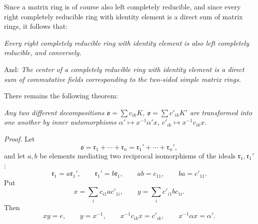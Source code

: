 \documentclass[11pt]{article}
\providecommand{\mo}{\mathfrak{o}}
\providecommand{\mr}{\mathfrak{r}}
\begin{document}
Since a matrix ring is of course also left completely reducible, and since every right completely reducible ring with identity element is a direct sum of matrix rings, it follows that:

\emph{Every right completely reducible ring with identity element is also left completely reducible, and conversely.}

And: \emph{The center of a completely reducible ring with identity element is a direct sum of commutative fields corresponding to the two-sided simple matrix rings.}

There remains the following theorem:

\emph{Any two different decompositions $\mo=\sum c_{ik}K$, $\mo=\sum c'_{ik}K'$ are transformed into one another by inner automorphisms $\alpha'\mapsto x^{-1}\alpha'x$, $c'_{ik}\mapsto x^{-1}c_{ik}x$.}

\emph{Proof.} Let
\[
        \mo=\mr_1+\cdots+\mr_n=\mr_1'+\cdots+\mr_n',
\]
and let $a,b$ be elements mediating two reciprocal isomorphisms of the ideals $\mr_1,\mr_1'$:
\[
        \mr_1=a\mr_1',
        \qquad
        \mr_1'=b\mr_1,
        \qquad
        ab=c_{11},
        \qquad
        ba=c'_{11}.
\]
Put
\[
        x=\sum_i c_{i1}ac'_{1i},
        \qquad
        y=\sum_i c'_{i1}bc_{1i}.
\]
Then
\[
        xy=e,
        \qquad
        y=x^{-1},
        \qquad
        x^{-1}c_{ik}x=c'_{ik},
        \qquad
        x^{-1}\alpha x=\alpha'.
\]
\end{document}
